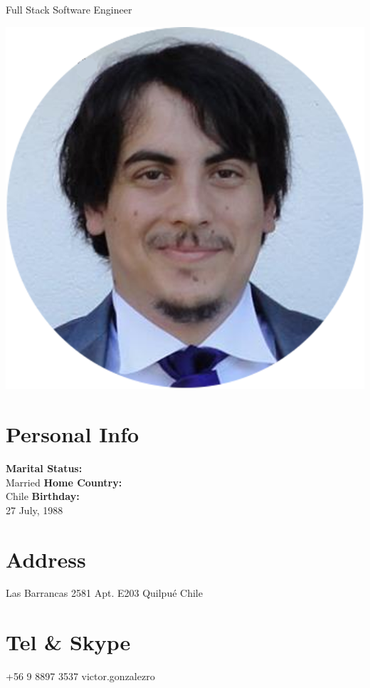 \documentclass[]{friggeri-cv}
\begin{document}
      {Full Stack Software Engineer}
      

\begin{aside}
  \includegraphics[scale=0.18]{img/cv_circle.png}
  \section{\faBookmark\space Personal Info}
    \textbf{Marital Status:}\\ Married
    \textbf{Home Country:}\\ Chile
    \textbf{Birthday:}\\ 27 July, 1988
    ~
  \section{\faHome\space Address}
    Las Barrancas 2581
	Apt. E203
	Quilpué
	Chile
    ~
  \section{\faPhone\space Tel \& Skype}
    \faMobile\space +56 9 8897 3537
    \faSkype\space victor.gonzalezro
    ~

\end{aside}
\end{document}

